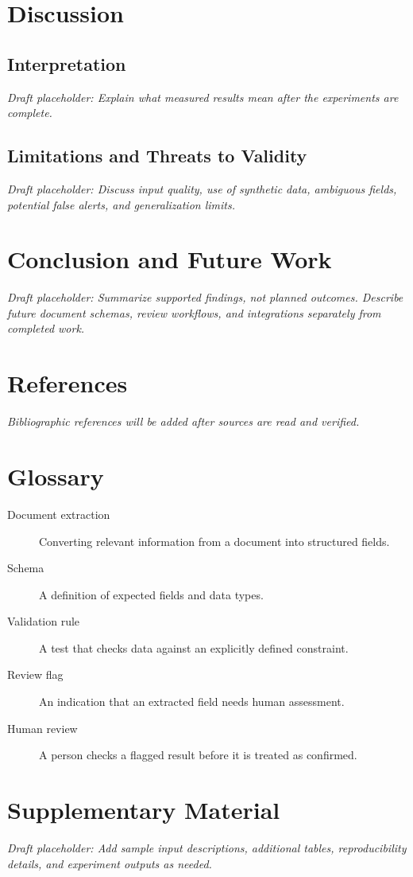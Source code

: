 \documentclass[11pt,letterpaper]{report}
\newcommand{\todowrite}[1]{\par\noindent\textit{Draft placeholder: #1}\par}
\begin{document}
\chapter{Discussion}
\section{Interpretation}
\todowrite{Explain what measured results mean after the experiments are complete.}

\section{Limitations and Threats to Validity}
\todowrite{Discuss input quality, use of synthetic data, ambiguous fields, potential false alerts, and generalization limits.}

\chapter{Conclusion and Future Work}
\todowrite{Summarize supported findings, not planned outcomes. Describe future document schemas, review workflows, and integrations separately from completed work.}

\chapter*{References}
\noindent\textit{Bibliographic references will be added after sources are read and verified.}
\printbibliography[heading=none]

\chapter*{Glossary}
\begin{description}
  \item[Document extraction] Converting relevant information from a document into structured fields.
  \item[Schema] A definition of expected fields and data types.
  \item[Validation rule] A test that checks data against an explicitly defined constraint.
  \item[Review flag] An indication that an extracted field needs human assessment.
  \item[Human review] A person checks a flagged result before it is treated as confirmed.
\end{description}

\appendix
\chapter{Supplementary Material}
\todowrite{Add sample input descriptions, additional tables, reproducibility details, and experiment outputs as needed.}
\end{document}
